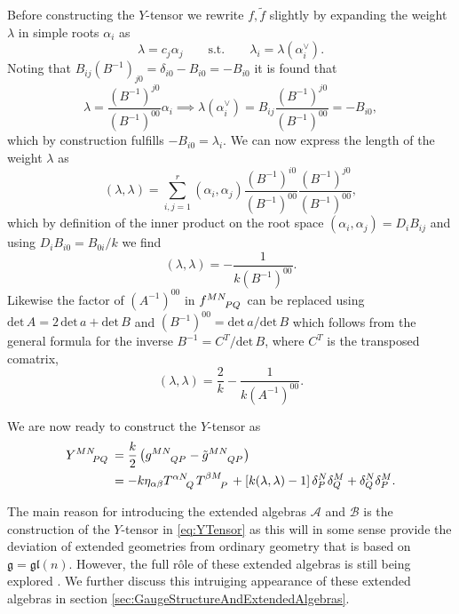 Before constructing the $Y$-tensor we rewrite $f,\tilde{f}$ slightly by expanding the weight $\lambda$ in simple roots $\alpha_i$ as 
\begin{equation}
    \lambda = c_j\alpha_j\qquad \text{s.t.}\qquad \lambda_i = \lambda(\alpha_i^\vee).
\end{equation}
Noting that $B_{ij}(B^{-1})_{j0}=\delta_{i0}-B_{i0}=-B_{i0}$ it is found that 
\begin{equation}
    \lambda = \frac{(B^{-1})^{j0}}{(B^{-1})^{00}}\alpha_i \implies \lambda(\alpha_i^\vee) = B_{ij}\frac{(B^{-1})^{j0}}{(B^{-1})^{00}} = -B_{i0},
\end{equation}
which by construction fulfills $-B_{i0}=\lambda_i$. We can now express the length of the weight $\lambda$ as 
\begin{equation}
    (\lambda,\lambda) = \sum_{i,j=1}^r (\alpha_i,\alpha_j)\frac{(B^{-1})^{i0}}{(B^{-1})^{00}}\frac{(B^{-1})^{j0}}{(B^{-1})^{00}},
\end{equation}
which by definition of the inner product on the root space $(\alpha_i,\alpha_j)=D_iB_{ij}$ and using $D_iB_{i0}=B_{0i}/k$ we find 
\begin{equation}
    (\lambda,\lambda) = -\frac{1}{k(B^{-1})^{00}}. 
\end{equation}
Likewise the factor of $(A^{-1})^{00}$ in $\tensor{f}{^{MN}_{PQ}}$ can be replaced using $\text{det}\, A=2\,\text{det}\,a+\text{det}\,B$ and $(B^{-1})^{00}=\text{det}\, a/\text{det}\,B$ which follows from the general formula for the inverse $B^{-1}=C^T/\text{det}\, B$, where $C^T$ is the transposed comatrix,
\begin{equation}
    (\lambda,\lambda) = \frac{2}{k}-\frac{1}{k(A^{-1})^{00}}.
\end{equation}

We are now ready to construct the $Y$-tensor as 
\begin{equation}\label{eq:YTensor}
    \begin{aligned}
        \tensor{Y}{^{MN}_{PQ}} &= \frac{k}{2}\left(\tensor{g}{^{MN}_{QP}}-\tensor{\tilde{g}}{^{MN}_{QP}}\right)\\
        & = -k\eta_{\alpha\beta}\tensor{T}{^{\alpha N}_Q}\tensor{T}{^{\beta M}_P}+\left[k(\lambda,\lambda)-1\right]\delta^N_P\delta^M_Q+\delta^N_Q\delta^M_P.
    \end{aligned}
\end{equation}

The main reason for introducing the extended algebras $\mathscr{A}$ and $\mathscr{B}$ is the construction of the $Y$-tensor in \eqref{eq:YTensor} as this will in some sense provide the deviation of extended geometries from ordinary geometry that is based on $\mathfrak{g}=\mathfrak{gl}(n)$. However, the full rôle of these extended algebras is still being explored \cite{Palmkvist:2013vya,Cederwall:2018aab,HohmZwiebach2013}. We further discuss this intruiging appearance of these extended algebras in section \ref{sec:GaugeStructureAndExtendedAlgebras}. 

